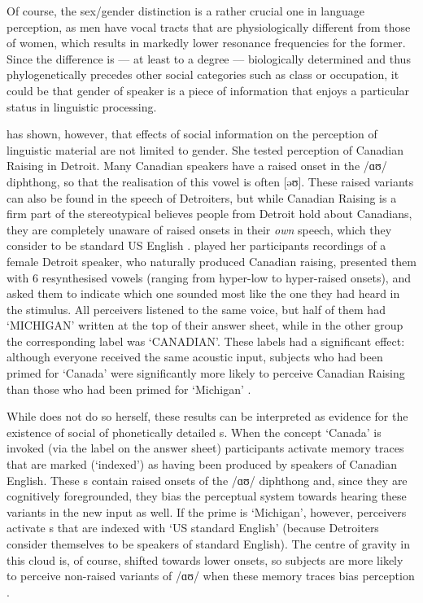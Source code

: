 Of course, the sex/gender distinction is a rather crucial one in language perception, as men have vocal tracts that are physiologically different from those of women, which results in markedly lower resonance frequencies for the former.
Since the difference is --- at least to a degree --- biologically determined and thus phylogenetically precedes other social categories such as class or occupation, it could be that gender of speaker is a piece of information that enjoys a particular status in linguistic processing.

\textcite{niedzielski1999} has shown, however, that effects of social information on the perception of linguistic material are not limited to gender.
She tested perception of Canadian Raising in Detroit.
Many Canadian speakers have a raised onset in the /ɑʊ/ diphthong, so that the realisation of this vowel is often [əʊ].
These raised variants can also be found in the speech of Detroiters, but while Canadian Raising is a firm part of the stereotypical believes people from Detroit hold about Canadians, they are completely unaware of raised onsets in their \emph{own} speech, which they consider to be standard US English \parencite[cf.][63]{niedzielski1999}.
\citeauthor{niedzielski1999} played her participants recordings of a female Detroit speaker, who naturally produced Canadian raising, presented them with 6 resynthesised vowels (ranging from hyper-low to hyper-raised onsets), and asked them to indicate which one sounded most like the one they had heard in the stimulus.
All perceivers listened to the same voice, but half of them had `MICHIGAN' written at the top of their answer sheet, while in the other group the corresponding label was `CANADIAN'.
These labels had a significant effect: although everyone received the same acoustic input, subjects who had been primed for `Canada' were significantly more likely to perceive Canadian Raising than those who had been primed for `Michigan' \parencite[cf.][64--68]{niedzielski1999}.

While \citeauthor{niedzielski1999} does not do so herself, these results can be interpreted as evidence for the existence of social  of phonetically detailed s.
When the concept `Canada' is invoked (via the label on the answer sheet) participants activate memory traces that are marked (`indexed') as having been produced by speakers of Canadian English.
These s contain raised onsets of the /ɑʊ/ diphthong and, since they are cognitively foregrounded, they bias the perceptual system towards hearing these variants in the new input as well.
If the prime is `Michigan', however, perceivers activate s that are indexed with `US standard English' (because Detroiters consider themselves to be speakers of standard English).
The centre of gravity in this  cloud is, of course, shifted towards lower onsets, so subjects are more likely to perceive non-raised variants of /ɑʊ/ when these memory traces bias perception \parencite[cf.][372]{hayetal2006a}.

